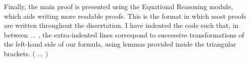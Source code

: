 \documentclass[12pt,twoside,notitlepage]{report}
\begin{document}
\begin{code}
\\
\> \AgdaSymbol{:} \AgdaSymbol{\{} \AgdaSymbol{:} \AgdaSymbol{\}}\<%
\\
\>[2]\<[14]%
\>[14] \AgdaSymbol{(} \AgdaSymbol{:}  \AgdaSymbol{)}\<%
\\
\>[2]\<[14]%
\>[14] \AgdaSymbol{(} \AgdaSymbol{:}  \AgdaSymbol{)}\<%
\\
\>[2]\<[14]%
\>[14]  \AgdaSymbol{(} \AgdaFunction{++} \AgdaSymbol{)}  \AgdaSymbol{(} \AgdaSymbol{)} \AgdaFunction{++} \AgdaSymbol{(} \AgdaSymbol{)}\<%
\\
\end{code}

Finally, the main proof is presented using the Equational Reasoning module, which aids writing more readable proofs. This is the format in which most proofs are written throughout the dissertation. I have indented the code such that, in between  ...
, the extra-indented lines correspond to successive transformations of the left-hand side of our formula, using lemmas provided inside the triangular brackets. ( ... )
\end{document}
